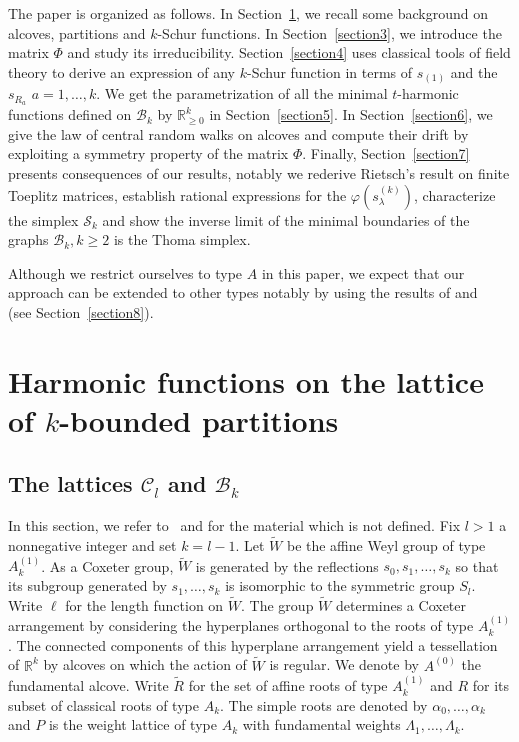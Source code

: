 \documentclass[ALCO,ThmDefs,Unicode,epreuves]{cedram}
\begin{document}
The paper is organized as follows. In Section~\ref{section2}, we recall some background on
alcoves, partitions and $k$-Schur functions. In Section~\ref{section3}, we introduce the
matrix $\Phi$ and study its irreducibility. Section~\ref{section4} uses classical tools of
field theory to derive an expression of any $k$-Schur function in terms of
$s_{(1)}$ and the $s_{R_{a}}$ $a=1,\ldots,k$. We get the parametrization of
all the minimal $t$-harmonic functions defined on $\mathcal{B}_{k}$ by
$\mathbb{R}_{\geq0}^{k}$ in Section~\ref{section5}. In Section~\ref{section6}, we give the law of
central random walks on alcoves and compute their drift by exploiting a
symmetry property of the matrix $\Phi$. Finally, Section~\ref{section7} presents
consequences of our results, notably we rederive Rietsch's result on finite
Toeplitz matrices, establish rational expressions for the $\varphi(s_{\lambda
}^{(k)})$, characterize the simplex $\mathcal{S}_{k}$ and show the inverse
limit of the minimal boundaries of the graphs $\mathcal{B}_{k},k\geq2$ is the
Thoma simplex.

Although we restrict ourselves to type $A$ in this paper, we expect that 
our approach can be extended to other types notably by using the results of
\cite{LSS} and~\cite{P} (see Section~\ref{section8}).

\section{Harmonic functions on the lattice of \texorpdfstring{$k$}{k}-bounded partitions}\label{section2}

\subsection{The lattices \texorpdfstring{$\mathcal{C}_{l}$}{Cl} and \texorpdfstring{$\mathcal{B}_{k}$}{BK}}
\label{subset_Lattices}

In this section, we refer to~\cite{LLMSSZ} and
\cite{Mac} for the material which is not defined. Fix $l>1$ a nonnegative
integer and set $k=l-1$. Let $\widetilde{W}$ be the affine Weyl group of type
$A_{k}^{(1)}$. As a Coxeter group, $\widetilde{W}$ is generated by the
reflections $s_{0},s_{1},\ldots,s_{k}$ so that its subgroup generated by
$s_{1},\ldots,s_{k}$ is isomorphic to the symmetric group $S_{l}$. Write
$\ell$ for the length function on $\widetilde{W}$. The group $\widetilde{W}$
determines a Coxeter arrangement by considering the hyperplanes orthogonal to
the roots of type $A_{k}^{(1)}$. The connected components of this hyperplane
arrangement yield a tessellation of $\mathbb{R}^{k}$ by alcoves on which the
action of $\widetilde{W}$ is regular. We denote by $A^{(0)}$ the fundamental
alcove. Write $\widetilde{R}$ for the set of affine roots of type $A_{k}%
^{(1)}$ and $R$ for its subset of classical roots of type $A_{k}$. The simple
roots are denoted by $\alpha_{0},\ldots,\alpha_{k}$ and $P$ is the weight
lattice of type $A_{k}$ with fundamental weights $\Lambda_{1},\ldots
,\Lambda_{k}$.
\end{document}
